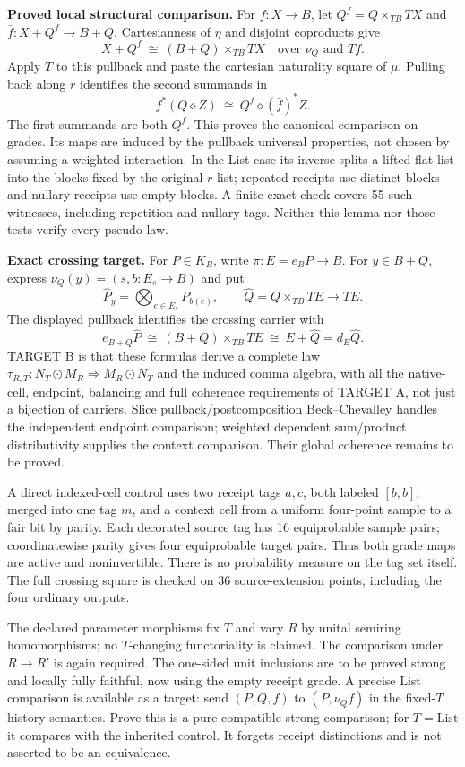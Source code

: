 \documentclass[11pt,a4paper]{article}
\newcommand{\status}[1]{\textbf{#1.}}
\begin{document}
\status{Proved local structural comparison}
For $f:X\to B$, let $Q^f=Q\times_{TB}TX$ and
$\bar f:X+Q^f\to B+Q$. Cartesianness of $\eta$ and disjoint coproducts give
\[
 X+Q^f\ \cong\ (B+Q)\times_{TB}TX
 \quad\text{over }\nu_Q\text{ and }Tf.
\]
Apply $T$ to this pullback and paste the cartesian naturality square of
$\mu$. Pulling back along $r$ identifies the second summands in
\[
 f^*(Q\diamond Z)\ \cong\ Q^f\diamond(\bar f)^*Z.
\]
The first summands are both $Q^f$. This proves the canonical comparison on
grades. Its maps are induced by the pullback universal properties, not
chosen by assuming a weighted interaction. In the List case its inverse
splits a lifted flat list into the blocks fixed by the original $r$-list;
repeated receipts use distinct blocks and nullary receipts use empty blocks.
A finite exact check covers 55 such witnesses, including repetition and
nullary tags. Neither this lemma nor those tests verify every pseudo-law.

\status{Exact crossing target}
For $P\in K_B$, write $\pi:E=e_BP\to B$. For $y\in B+Q$, express
$\nu_Q(y)=(s,b:E_s\to B)$ and put
\[
 \widehat P_y=\bigotimes_{e\in E_s}P_{b(e)},\qquad
 \widehat Q=Q\times_{TB}TE\longrightarrow TE.
\]
The displayed pullback identifies the crossing carrier with
\[
 e_{B+Q}\widehat P\ \cong\ (B+Q)\times_{TB}TE
 \ \cong\ E+\widehat Q=d_E\widehat Q.
\]
TARGET B is that these formulas derive a complete law
$\tau_{R,T}:N_T\odot M_R\Rightarrow M_R\odot N_T$ and the induced
comma algebra, with all the native-cell, endpoint, balancing and full
coherence requirements of TARGET A, not just a bijection of carriers.
Slice pullback/postcomposition Beck--Chevalley handles the independent
endpoint comparison; weighted dependent sum/product distributivity supplies
the context comparison. Their global coherence remains to be proved.

A direct indexed-cell control uses two receipt tags $a,c$, both labeled
$[b,b]$, merged into one tag $m$, and a context cell from a uniform four-point
sample to a fair bit by parity. Each decorated source tag has 16 equiprobable
sample pairs; coordinatewise parity gives four equiprobable target pairs.
Thus both grade maps are active and noninvertible. There is no probability
measure on the tag set itself. The full crossing square is checked on
36 source-extension points, including the four ordinary outputs.

The declared parameter morphisms fix $T$ and vary $R$ by unital semiring
homomorphisms; no $T$-changing functoriality is claimed. The comparison under
$R\to R'$ is again required. The one-sided
unit inclusions are to be proved strong and locally fully faithful, now
using the empty receipt grade. A precise List comparison is available as a
target: send $(P,Q,f)$ to $(P,\nu_Qf)$ in the fixed-$T$ history semantics.
Prove this is a pure-compatible strong comparison; for $T=\mathrm{List}$
it compares with the inherited control. It forgets receipt distinctions
and is not asserted to be an equivalence.
\end{document}

